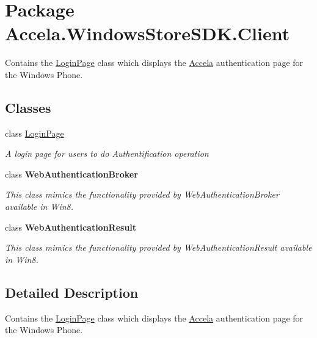 \hypertarget{namespace_accela_1_1_windows_store_s_d_k_1_1_client}{\section{Package Accela.\+Windows\+Store\+S\+D\+K.\+Client}
\label{namespace_accela_1_1_windows_store_s_d_k_1_1_client}
}


Contains the \hyperlink{class_accela_1_1_windows_store_s_d_k_1_1_client_1_1_login_page}{Login\+Page} class which displays the \hyperlink{namespace_accela}{Accela} authentication page for the Windows Phone.  


\subsection*{Classes}
\begin{DoxyCompactItemize}
\item 
class \hyperlink{class_accela_1_1_windows_store_s_d_k_1_1_client_1_1_login_page}{Login\+Page}
\begin{DoxyCompactList}\small\item\em A login page for users to do Authentification operation \end{DoxyCompactList}\item 
class {\bfseries Web\+Authentication\+Broker}
\begin{DoxyCompactList}\small\item\em This class mimics the functionality provided by Web\+Authentication\+Broker available in Win8. \end{DoxyCompactList}\item 
class {\bfseries Web\+Authentication\+Result}
\begin{DoxyCompactList}\small\item\em This class mimics the functionality provided by Web\+Authentication\+Result available in Win8. \end{DoxyCompactList}\end{DoxyCompactItemize}


\subsection{Detailed Description}
Contains the \hyperlink{class_accela_1_1_windows_store_s_d_k_1_1_client_1_1_login_page}{Login\+Page} class which displays the \hyperlink{namespace_accela}{Accela} authentication page for the Windows Phone. 

